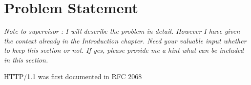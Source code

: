 \chapter{Problem Statement}
\textit{Note to supervisor : I will describe the problem in detail. However I have given the context already in the Introduction chapter. Need your valuable input whether to keep this section or not. If yes, please provide me a hint what can be included in this section. }

HTTP/1.1 was first documented in RFC 2068 \cite{b9}